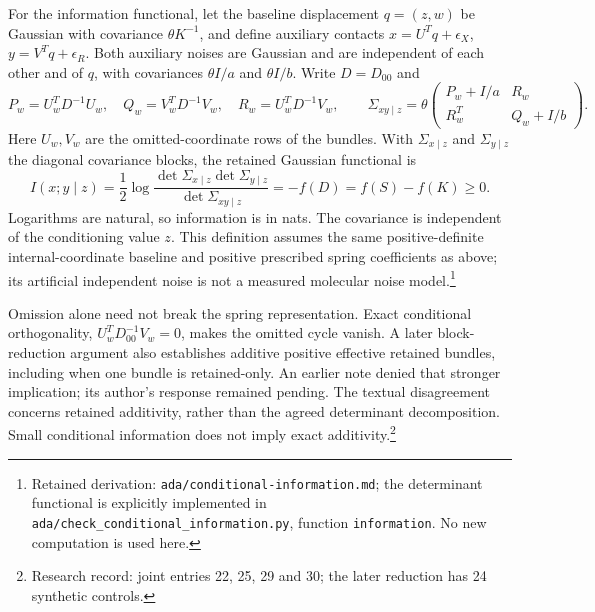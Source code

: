\documentclass{article}
\begin{document}
For the information functional, let the baseline displacement \(q=(z,w)\) be Gaussian with covariance \(\theta K^{-1}\), and define auxiliary contacts \(x=U^Tq+\epsilon_X\), \(y=V^Tq+\epsilon_R\). Both auxiliary noises are Gaussian and are independent of each other and of \(q\), with covariances \(\theta I/a\) and \(\theta I/b\). Write \(D=D_{00}\) and
\[
 P_w=U_w^TD^{-1}U_w,\quad Q_w=V_w^TD^{-1}V_w,\quad R_w=U_w^TD^{-1}V_w,
 \qquad
 \Sigma_{xy\mid z}=\theta\begin{pmatrix}P_w+I/a&R_w\\R_w^T&Q_w+I/b\end{pmatrix}.
\]
Here \(U_w,V_w\) are the omitted-coordinate rows of the bundles. With \(\Sigma_{x\mid z}\) and \(\Sigma_{y\mid z}\) the diagonal covariance blocks, the retained Gaussian functional is
\[
 I(x;y\mid z)=\frac12\log\frac{\det\Sigma_{x\mid z}\det\Sigma_{y\mid z}}
 {\det\Sigma_{xy\mid z}}=-f(D)=f(S)-f(K)\ge0.
\]
Logarithms are natural, so information is in nats. The covariance is independent of the conditioning value \(z\). This definition assumes the same positive-definite internal-coordinate baseline and positive prescribed spring coefficients as above; its artificial independent noise is not a measured molecular noise model.\footnote{Retained derivation: \texttt{ada/conditional-information.md}; the determinant functional is explicitly implemented in \texttt{ada/check\_conditional\_information.py}, function \texttt{information}. No new computation is used here.}

Omission alone need not break the spring representation. Exact conditional orthogonality, \(U_w^TD_{00}^{-1}V_w=0\), makes the omitted cycle vanish. A later block-reduction argument also establishes additive positive effective retained bundles, including when one bundle is retained-only. An earlier note denied that stronger implication; its author's response remained pending. The textual disagreement concerns retained additivity, rather than the agreed determinant decomposition. Small conditional information does not imply exact additivity.\footnote{Research record: joint entries 22, 25, 29 and 30; the later reduction has 24 synthetic controls.}
\end{document}
